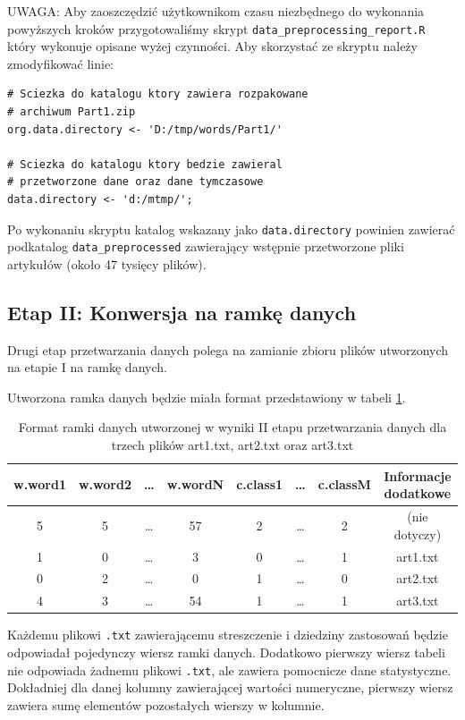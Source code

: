 \documentclass[a4paper,12pt]{article}
\begin{document}
		\textsc{UWAGA:} Aby zaoszczędzić użytkownikom czasu niezbędnego
		do wykonania powyższych kroków przygotowaliśmy skrypt 
		\verb+data_preprocessing_report.R+ który wykonuje opisane wyżej
		czynności. Aby skorzystać ze skryptu należy zmodyfikować
		linie:
		\begin{verbatim}
# Sciezka do katalogu ktory zawiera rozpakowane
# archiwum Part1.zip
org.data.directory <- 'D:/tmp/words/Part1/'

# Sciezka do katalogu ktory bedzie zawieral
# przetworzone dane oraz dane tymczasowe
data.directory <- 'd:/mtmp/';
		\end{verbatim}
		Po wykonaniu skryptu katalog wskazany jako \verb+data.directory+
		powinien zawierać podkatalog \verb+data_preprocessed+ zawierający
		wstępnie przetworzone pliki artykułów (około 47 tysięcy plików).	
	
	\subsection{Etap II: Konwersja na ramkę danych}
		Drugi etap przetwarzania danych polega na zamianie zbioru
		plików utworzonych na etapie I na ramkę danych.
		
		Utworzona ramka danych będzie miała format przedstawiony w
		tabeli \ref{t:df}.
		\begin{table}[!h]	
			\begin{center}	
			\small			
			\begin{tabular}{|c|c|c|c|c|c|c|c|}
				\hline
				w.word1 & w.word2 & \ldots & w.wordN & c.class1 & \ldots & c.classM & Informacje dodatkowe \\
				\hline \hline
				5 & 5 & \ldots & 57 & 2 & \ldots & 2 & (nie dotyczy) \\
				\hline
				1 & 0 & \ldots & 3 & 0 & \ldots & 1 & art1.txt \\
				\hline
				0 & 2 & \ldots & 0 & 1 & \ldots & 0 & art2.txt \\
				\hline
				4 & 3 & \ldots & 54 & 1 & \ldots & 1 & art3.txt \\
				\hline
			\end{tabular}	
			\end{center}				
		
			\caption{Format ramki danych utworzonej w wyniki II etapu
			przetwarzania danych dla trzech plików art1.txt, art2.txt oraz
			art3.txt}
			\label{t:df}
		\end{table}
		Każdemu plikowi \texttt{.txt} zawierającemu streszczenie i 
		dziedziny zastosowań będzie odpowiadał pojedynczy wiersz ramki danych.
		Dodatkowo pierwszy wiersz tabeli nie odpowiada żadnemu plikowi
		\texttt{.txt}, ale zawiera pomocnicze dane statystyczne.
		Dokładniej dla danej kolumny zawierającej wartości numeryczne,
		pierwszy wiersz zawiera sumę elementów pozostałych wierszy w
		kolumnie.
		
\end{document}
